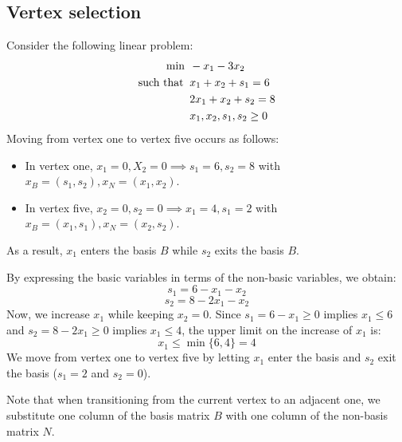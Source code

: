 \subsection*{Vertex selection}
\begin{example}
    Consider the following linear problem:
    \begin{align*}
        \min                      \:&\: -x_1-3x_2          \\
        \textnormal{such that }     &\: x_1+x_2+s_1 = 6  \\
                                    &\: 2x_1+x_2+s_2 = 8  \\
                                    &\: x_1,x_2,s_1,s_2 \geq 0
    \end{align*}
    Moving from vertex one to vertex five occurs as follows:
    \begin{itemize}
        \item In vertex one, $x_1 = 0, X_2=0 \implies s_1 = 6, s_2 = 8$ with $x_B = (s_1, s_2), x_N = (x_1, x_2)$.
        \item In vertex five, $x_2=0,s_2=0 \implies x_1=4,s_1=2$ with $x_B = (x_1, s_1), x_N = (x_2, s_2)$.
    \end{itemize}
    As a result, $x_1$ enters the basis $B$ while $s_2$ exits the basis $B$.

    By expressing the basic variables in terms of the non-basic variables, we obtain:
    \[s_1=6-x_1-x_2\]
    \[s_2=8-2x_1-x_2\]
    Now, we increase $x_1$ while keeping $x_2 = 0$.
    Since $s_1=6-x_1 \geq 0$ implies $x_1 \leq 6$ and $s_2=8-2x_1 \geq 0$ implies $x_1 \leq 4$, the upper limit on the increase of $x_1$ is: 
    \[x_1 \leq \min\{6,4\}=4\]
    We move from vertex one to vertex five by letting $x_1$ enter the basis and $s_2$ exit the basis ($s_1=2$ and $s_2=0$). 
\end{example}
Note that when transitioning from the current vertex to an adjacent one, we substitute one column of the basis matrix $B$ with one column of the non-basis matrix $N$.

